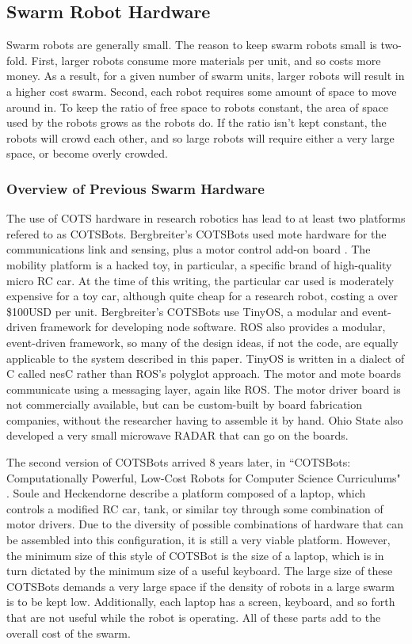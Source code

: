 \documentclass[]{article}
\begin{document}
\subsection{Swarm Robot Hardware}

Swarm robots are generally small. 
The reason to keep swarm robots small is two-fold. 
First, larger robots consume more materials per unit, and so costs more money.
As a result, for a given number of swarm units, larger robots will result in a higher cost swarm. 
Second, each robot requires some amount of space to move around in. 
To keep the ratio of free space to robots constant, the area of space used by the robots grows as the robots do. 
If the ratio isn't kept constant, the robots will crowd each other, and so large robots will require either a very large space, or become overly crowded.

\subsubsection{Overview of Previous Swarm Hardware}

The use of COTS hardware in research robotics has lead to at least two platforms refered to as COTSBots.
Bergbreiter's COTSBots used mote hardware for the communications link and sensing, plus a motor control add-on board  \cite{bergbreiter2003cotsbots}. 
The mobility platform is a hacked toy, in particular, a specific brand of high-quality micro RC car.
At the time of this writing, the particular car used is moderately expensive for a toy car, although quite cheap for a research robot, costing a over \$100USD per unit. 
Bergbreiter's COTSBots use TinyOS, a modular and event-driven framework for developing node software. 
ROS also provides a modular, event-driven framework, so many of the design ideas, if not the code, are equally applicable to the system described in this paper. 
TinyOS is written in a dialect of C called nesC rather than ROS's polyglot approach. The motor and mote boards communicate using a messaging layer, again like ROS. 
The motor driver board is not commercially available, but can be custom-built by board fabrication companies, without the researcher having to assemble it by hand. 
Ohio State also developed a very small microwave RADAR that can go on the boards.

The second version of COTSBots arrived 8 years later, in ``COTSBots: Computationally Powerful, Low-Cost Robots for Computer Science Curriculums" \cite{soule2011cotsbots}. Soule and Heckendorne describe a platform composed of a laptop, which controls a modified RC car, tank, or similar toy through some combination of motor drivers. 
Due to the diversity of possible combinations of hardware that can be assembled into this configuration, it is still a very viable platform. 
However, the minimum size of this style of COTSBot is the size of a laptop, which is in turn dictated by the minimum size of a useful keyboard. 
The large size of these COTSBots demands a very large space if the density of robots in a large swarm is to be kept low. 
Additionally, each laptop has a screen, keyboard, and so forth that are not useful while the robot is operating. 
All of these parts add to the overall cost of the swarm. 
\end{document}
